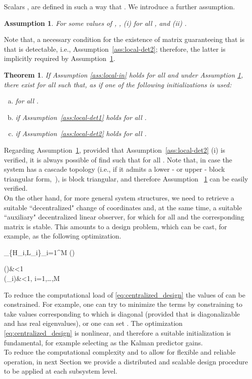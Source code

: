 \documentclass[journal,10pt,draftcls,onecolumn]{IEEEtran}
\newtheorem{theorem}{Theorem}
\newtheorem{assumption}{Assumption}
\begin{document}
Scalars ,  are defined in such a way that . We introduce a further assumption.
\begin{assumption}
For some values of , , (i)  for all , and (ii) .
\label{ass:small-gain-global}
\end{assumption}
Note that, a necessary condition for the existence of matrix  guaranteeing that  is that  is detectable, i.e., Assumption~\ref{ass:local-det2}; therefore, the latter is implicitly required by Assumption~\ref{ass:small-gain-global}.
\begin{theorem}
\label{prop:small-gain}
 If Assumption \ref{ass:local-in} holds for all  and under Assumption \ref{ass:small-gain-global}, there exist  for all  such that,  as  if one of the following initializations is used:
\begin{enumerate}[a.]
\item  for all .
\item  if Assumption~\ref{ass:local-det1} holds for all .
\item  if Assumption~\ref{ass:local-det2} holds for all .\hfill{}
\end{enumerate}
\end{theorem}
Regarding Assumption~\ref{ass:small-gain-global}, provided that Assumption~\ref{ass:local-det2} (i) is verified, it is always possible of find  such that  for all . Note that, in case the system has a cascade topology (i.e., if it admits a lower - or upper - block triangular form,~\cite{Siljak91}),  is block triangular, and therefore Assumption ~\ref{ass:small-gain-global} can be easily verified.\\
On the other hand, for more general system structures, we need to retrieve a suitable ``decentralized" change of coordinates and, at the same time, a suitable ``auxiliary" decentralized linear observer, for which  for all  and the corresponding matrix  is stable. This amounts to a design problem, which can be cast, for example, as the following optimization.

\min_{\{H_{i},L_{i}\}_{i=1}^M} \sigma(\Gamma)

\sigma(\Gamma)&<1\\
\sigma(_i)&<1,\,\,i=1,\dots,M

To reduce the computational load of \eqref{eq:centralized_design} the values of  can be constrained. For example, one can try to minimize the terms  by constraining  to take values corresponding to which  is diagonal (provided that  is diagonalizable and has real eigenvalues), or one can set . The optimization \eqref{eq:centralized_design} is nonlinear, and therefore a suitable initialization is fundamental, for example selecting  as the Kalman predictor gains.\\
To reduce the computational complexity and to allow for flexible and reliable operation, in next Section we provide a distributed and scalable design procedure to be applied at each subsystem level.
\end{document}
